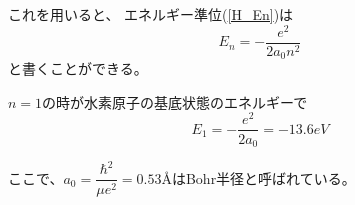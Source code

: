 \documentclass[dvipdfmx,a4paper,16pt]{jsarticle}
\begin{document}
これを用いると、
エネルギー準位(\ref{H_En})は
\begin{equation}
	E_n = -\dfrac{e^2}{2a_0n^2}
\end{equation}
と書くことができる。

$n = 1$の時が水素原子の基底状態のエネルギーで
\begin{equation}
	E_1 = -\dfrac{e^2}{2a_0} = -13.6 \si{eV}
\end{equation}

ここで、$a_0 = \dfrac{\hbar^2}{\mu e^2} = 0.53 \text{\AA}$はBohr半径と呼ばれている。


\end{document}

